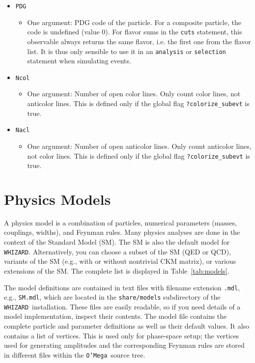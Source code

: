 \documentclass[12pt]{book}
\newcommand{\ttt}[1]{\texttt{#1}}
\newcommand{\whizard}{\ttt{WHIZARD}}
\newcommand{\oMega}{\ttt{O'Mega}}
\begin{document}
\begin{itemize}
\item \ttt{PDG}
  \begin{itemize}
  \item One argument: PDG code of the particle.  For a composite particle, the
    code is undefined (value 0).  For flavor sums in the \ttt{cuts} statement,
    this observable always returns the same flavor, i.e. the first one from the
    flavor list.  It is thus only sensible to use it in an \ttt{analysis} or
    \ttt{selection} statement when simulating events.
  \end{itemize}
\item \ttt{Ncol}
  \begin{itemize}
  \item One argument: Number of open color lines.  Only count color
    lines, not anticolor lines.  This is defined only if the global flag
    \ttt{?colorize\_subevt} is true.
  \end{itemize}
\item \ttt{Nacl}
  \begin{itemize}
  \item One argument: Number of open anticolor lines.  Only count anticolor
    lines, not color lines.  This is defined only if the global flag
    \ttt{?colorize\_subevt} is true.
  \end{itemize}
\end{itemize}



\section{Physics Models}
\label{sec:models}

A physics model is a combination of particles, numerical parameters (masses,
couplings, widths), and Feynman rules.  Many physics analyses are done in the
context of the Standard Model (SM).  The SM is also the default model for
\whizard.  Alternatively, you can choose a subset of the SM (QED or QCD),
variants of the SM (e.g., with or without nontrivial CKM matrix), or various
extensions of the SM.  The complete list is displayed in
Table~\ref{tab:models}.

The model definitions are contained in text files with filename extension
\ttt{.mdl}, e.g., \ttt{SM.mdl}, which are located in the \ttt{share/models}
subdirectory of the \whizard\ installation.  These files are easily readable,
so if you need details of a model implementation, inspect their contents.  The
model file contains the complete particle and parameter definitions as well as
their default values.  It also contains a list of vertices.  This is used only
for phase-space setup; the vertices used for generating amplitudes and the
corresponding Feynman rules are stored in different files within the
\oMega\ source tree.
\end{document}
